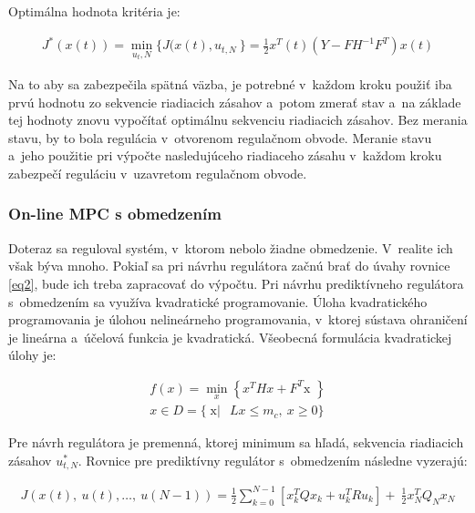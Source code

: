 Optimálna hodnota kritéria je:

\begin{equation} \label{eq14}
\begin{split}
J^{*}\left( x\left( t \right) \right) = \min_{u_t,N}{\{ J(x\left( t \right),u_{t,N}\ \}} = \frac{1}{2}x^{T}(t)(Y - FH^{- 1}F^{T})x(t)
\end{split}
\end{equation}

Na to aby sa zabezpečila spätná väzba, je potrebné v~každom kroku použiť
iba prvú hodnotu zo sekvencie riadiacich zásahov a~potom zmerať stav
a~na základe tej hodnoty znovu vypočítať optimálnu sekvenciu riadiacich
zásahov. Bez merania stavu, by to bola regulácia v~otvorenom regulačnom
obvode. Meranie stavu a~jeho použitie pri výpočte nasledujúceho
riadiaceho zásahu v~každom kroku zabezpečí reguláciu v~uzavretom
regulačnom obvode.

\subsubsection{On-line MPC s obmedzením}

Doteraz sa reguloval systém, v~ktorom nebolo žiadne obmedzenie.
V~realite ich však býva mnoho. Pokiaľ sa pri návrhu regulátora začnú
brať do úvahy rovnice \ref{eq2}, bude ich treba zapracovať do výpočtu. Pri
návrhu prediktívneho regulátora s~obmedzením sa využíva kvadratické
programovanie. Úloha kvadratického programovania je úlohou nelineárneho
programovania, v~ktorej sústava ohraničení je lineárna a~účelová funkcia
je kvadratická. Všeobecná formulácia kvadratickej úlohy je:

\begin{equation} \label{eq15}
\begin{split}
f\left( x \right) = \min_{x}\left\{ x^{T}Hx + F^{T}\text{x\ } \right\} \\
x \in D = \{\operatorname{x|}{\ \ Lx \leq m_{c}},\ x \geq 0\}
\end{split}
\end{equation}

Pre návrh regulátora je premenná, ktorej minimum sa hľadá, sekvencia
riadiacich zásahov \(u_{t,N}^{*}\). Rovnice pre prediktívny regulátor
s~obmedzením následne vyzerajú:

\begin{equation} \label{eq16}
\begin{split}
J\left( x\left( t \right),\ u\left( t \right),\ldots,\ u\left( N - 1 \right) \right) = \frac{1}{2}\sum_{k = 0}^{N - 1}\left\lbrack x_{k}^{T}Qx_{k} + u_{k}^{T}Ru_{k} \right\rbrack + \ \frac{1}{2}x_{N}^{T}Q_{N}x_{N}
\end{split}
\end{equation}


